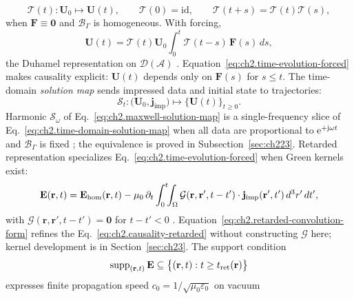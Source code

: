 \begin{equation}
\label{eq:ch2.time-semigroup-definition}
\mathcal{T}(t):\mathbf{U}_0\longmapsto \mathbf{U}(t),
\qquad
\mathcal{T}(0)=\mathrm{id},\qquad
\mathcal{T}(t+s)=\mathcal{T}(t)\mathcal{T}(s),
\end{equation}
when \(\mathbf{F}\equiv\mathbf{0}\) and \(\mathcal{B}_\Gamma\) is homogeneous. With
forcing,
\begin{equation}
\label{eq:ch2.time-evolution-forced}
\mathbf{U}(t)
=
\mathcal{T}(t)\mathbf{U}_0
\int_0^t \mathcal{T}(t-s)\,\mathbf{F}(s)\,ds,
\end{equation}
the Duhamel representation on \(\mathcal{D}(\mathcal{A})\)
\cite{stratton1941}. Equation~\eqref{eq:ch2.time-evolution-forced}
makes causality explicit: \(\mathbf{U}(t)\) depends only on
\(\mathbf{F}(s)\) for \(s\le t\). The time-domain \emph{solution map} sends impressed
data and initial state to trajectories:
\begin{equation}
\label{eq:ch2.time-domain-solution-map}
\mathcal{S}_{t}:\big(\mathbf{U}_0,\mathbf{j}_{\mathrm{imp}}\big)\longmapsto
\{\mathbf{U}(t)\}_{t\ge 0}.
\end{equation}
Harmonic \(\mathcal{S}_\omega\) of Eq.~\eqref{eq:ch2.maxwell-solution-map} is a
single-frequency slice of Eq.~\eqref{eq:ch2.time-domain-solution-map} when all data
are proportional to \(\mathrm{e}^{+\mathrm{j}\omega t}\) and \(\mathcal{B}_\Gamma\) is fixed
\cite{stratton1941}; the equivalence is proved in Subsection~\ref{sec:ch223}.
Retarded representation specializes Eq.~\eqref{eq:ch2.time-evolution-forced} when
Green kernels exist:
\begin{equation}
\label{eq:ch2.retarded-convolution-form}
\mathbf{E}(\mathbf{r},t)
=
\mathbf{E}_{\mathrm{hom}}(\mathbf{r},t)
-\mu_0\,\partial_t
\int_0^t\!\!\int_\Omega
\mathcal{G}(\mathbf{r},\mathbf{r}',t-t')\cdot
\mathbf{j}_{\mathrm{imp}}(\mathbf{r}',t')\,d^{3}r'\,dt',
\end{equation}
with \(\mathcal{G}(\mathbf{r},\mathbf{r}',t-t')=\mathbf{0}\) for \(t-t'<0\)
\cite{stratton1941}. Equation~\eqref{eq:ch2.retarded-convolution-form} refines the
Eq.~\eqref{eq:ch2.causality-retarded} without constructing \(\mathcal{G}\)
here; kernel development is in Section~\ref{sec:ch23}. The support condition
\begin{equation}
\label{eq:ch2.causal-support-constraint}
\operatorname{supp}_{(\mathbf{r},t)}\mathbf{E}
\subseteq
\big\{(\mathbf{r},t): t\ge t_{\mathrm{ret}}(\mathbf{r})\big\}
\end{equation}
expresses finite propagation speed \(c_0=1/\sqrt{\mu_0\varepsilon_0}\) on vacuum
